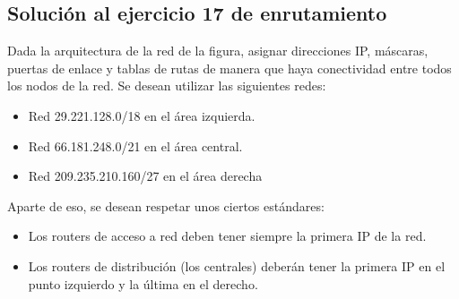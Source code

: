 \documentclass[letterpaper,10pt,spanish]{sphinxmanual}
\begin{document}
\subsection{Solución al ejercicio 17 de enrutamiento}
\label{\detokenize{t2_integracion_elementos/ejercicios_subredes_ipv4/ejercicios_dos_router:solucion-al-ejercicio-17-de-enrutamiento}}
\sphinxAtStartPar
Dada la arquitectura de la red de la figura, asignar direcciones IP, máscaras, puertas de enlace y tablas de rutas de manera que haya conectividad entre todos
los nodos de la red. Se desean utilizar las siguientes redes:
\begin{itemize}
\item {} 
\sphinxAtStartPar
Red 29.221.128.0/18 en el área izquierda.

\item {} 
\sphinxAtStartPar
Red 66.181.248.0/21 en el área central.

\item {} 
\sphinxAtStartPar
Red 209.235.210.160/27 en el área derecha

\end{itemize}

\begin{figure}[htbp]
\centering

\noindent{}
\end{figure}

\sphinxAtStartPar
Aparte de eso, se desean respetar unos ciertos estándares:
\begin{itemize}
\item {} 
\sphinxAtStartPar
Los routers de acceso a red deben tener siempre la primera IP de la red.

\item {} 
\sphinxAtStartPar
Los routers de distribución (los centrales) deberán tener la primera IP en el punto izquierdo y la última en el derecho.

\end{itemize}
\end{document}

